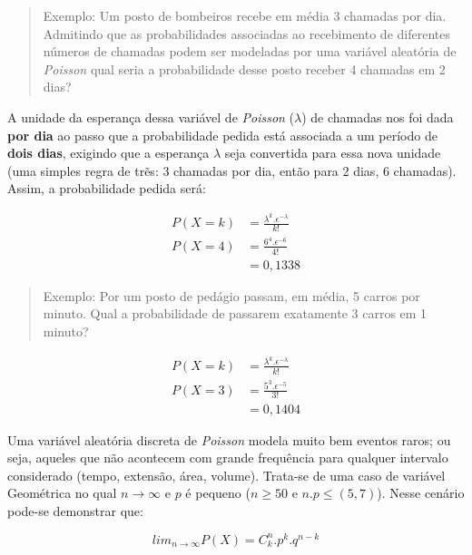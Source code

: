 \documentclass[
]{book}
\begin{document}
\begin{quote}
Exemplo: Um posto de bombeiros recebe em média 3 chamadas por dia. Admitindo que as probabilidades associadas ao recebimento de diferentes números de chamadas podem ser modeladas por uma variável aleatória de \emph{Poisson} qual seria a probabilidade desse posto receber 4 chamadas em 2 dias?
\end{quote}

\hfill\break

A unidade da esperança dessa variável de \emph{Poisson} (\(\lambda\)) de chamadas nos foi dada \textbf{por dia} ao passo que a probabilidade pedida está associada a um período de \textbf{dois dias}, exigindo que a esperança \(\lambda\) seja convertida para essa nova unidade (uma simples regra de trẽs: 3 chamadas por dia, então para 2 dias, 6 chamadas). Assim, a probabilidade pedida será:

\hfill\break

\begin{align*}
P(X=k) & = \frac{\lambda ^{k}. \epsilon^{-\lambda}} {k!}\\
P(X=4) & = \frac{6^{4}. \epsilon^{-6}} {4!} \\
       & = 0,1338
\end{align*}

\hfill\break

\begin{quote}
Exemplo: Por um posto de pedágio passam, em média, 5 carros por minuto. Qual a probabilidade de passarem exatamente 3 carros em 1 minuto?
\end{quote}

\hfill\break

\begin{align*}
P(X=k) & = \frac{\lambda ^{k}. \epsilon^{-\lambda}} {k!} \\
P(X=3) & = \frac{5^{3}. \epsilon^{-5}} {3!} \\
       & = 0,1404
\end{align*}

Uma variável aleatória discreta de \emph{Poisson} modela muito bem eventos raros; ou seja, aqueles que não acontecem com grande frequência para qualquer intervalo considerado (tempo, extensão, área, volume). Trata-se de uma caso de variável Geométrica no qual \(n \to \infty\) e \(p\) é pequeno (\(n \ge 50\) e \(n . p \le (5,7)\)). Nesse cenário pode-se demonstrar que:

\hfill\break

\[
lim_{n \to \infty} P(X) = {C}_{k}^{n}. {p}^{k}. {q}^{n-k}
\]
\end{document}
